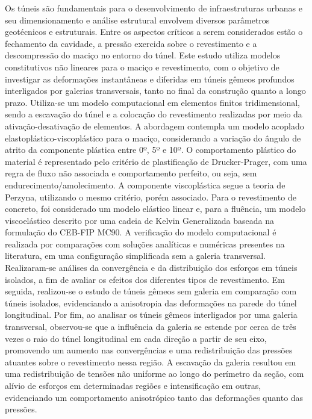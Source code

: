 %
%
%
%
Os túneis são fundamentais para o desenvolvimento de infraestruturas urbanas e seu dimensionamento e análise estrutural envolvem diversos parâmetros geotécnicos e estruturais. Entre os aspectos críticos a serem considerados estão o fechamento da cavidade, a pressão exercida sobre o revestimento e a descompressão do maciço no entorno do túnel. Este estudo utiliza modelos constitutivos não lineares para o maciço e revestimento, com o objetivo de investigar as deformações instantâneas e diferidas em túneis gêmeos profundos interligados por galerias transversais, tanto no final da construção quanto a longo prazo. Utiliza-se um modelo computacional em elementos finitos tridimensional, sendo a escavação do túnel e a colocação do revestimento realizadas por meio da ativação-desativação de elementos. A abordagem contempla um modelo acoplado elastoplástico-viscoplástico para o maciço, considerando a variação do ângulo de atrito da componente plástica entre 0º, 5º e 10º. O comportamento plástico do material é representado pelo critério de plastificação de Drucker-Prager, com uma regra de fluxo não associada e comportamento perfeito, ou seja, sem endurecimento/amolecimento. A componente viscoplástica segue a teoria de Perzyna, utilizando o mesmo critério, porém associado. Para o revestimento de concreto, foi considerado um modelo elástico linear e, para a fluência, um modelo viscoelástico descrito por uma cadeia de Kelvin Generalizada baseada na formulação do CEB-FIP MC90. A verificação do modelo computacional é realizada por comparações com soluções analíticas e numéricas presentes na literatura, em uma configuração simplificada sem a galeria transversal. Realizaram-se análises da convergência e da distribuição dos esforços em túneis isolados, a fim de avaliar os efeitos dos diferentes tipos de revestimento. Em seguida, realizou-se o estudo de túneis gêmeos sem galeria em comparação com túneis isolados, evidenciando a anisotropia das deformações na parede do túnel longitudinal. Por fim, ao analisar os túneis gêmeos interligados por uma galeria transversal, observou-se que a influência da galeria se estende por cerca de três vezes o raio do túnel longitudinal em cada direção a partir de seu eixo, promovendo um aumento nas convergências e uma redistribuição das pressões atuantes sobre o revestimento nessa região. A escavação da galeria resultou em uma redistribuição de tensões não uniforme ao longo do perímetro da seção, com alívio de esforços em determinadas regiões e intensificação em outras, evidenciando um comportamento anisotrópico tanto das deformações quanto das pressões.

